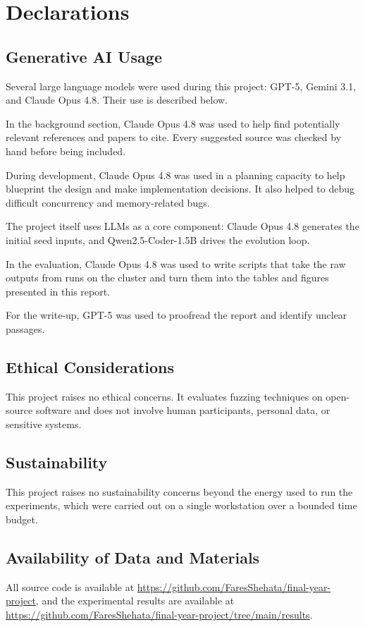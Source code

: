 \chapter{Declarations}

\section{Generative AI Usage}

Several large language models were used during this project: GPT-5, Gemini 3.1, and Claude Opus 4.8. Their use is described below.

In the background section, Claude Opus 4.8 was used to help find potentially relevant references and papers to cite. Every suggested source was checked by hand before being included.

During development, Claude Opus 4.8 was used in a planning capacity to help blueprint the design and make implementation decisions. It also helped to debug difficult concurrency and memory-related bugs.

The project itself uses LLMs as a core component: Claude Opus 4.8 generates the initial seed inputs, and Qwen2.5-Coder-1.5B drives the evolution loop.

In the evaluation, Claude Opus 4.8 was used to write scripts that take the raw outputs from runs on the cluster and turn them into the tables and figures presented in this report.

For the write-up, GPT-5 was used to proofread the report and identify unclear passages.

\section{Ethical Considerations}

This project raises no ethical concerns. It evaluates fuzzing techniques on open-source software and does not involve human participants, personal data, or sensitive systems.

\section{Sustainability}

This project raises no sustainability concerns beyond the energy used to run the experiments, which were carried out on a single workstation over a bounded time budget.

\section{Availability of Data and Materials}

All source code is available at \url{https://github.com/FaresShehata/final-year-project}, and the experimental results are available at \url{https://github.com/FaresShehata/final-year-project/tree/main/results}.
